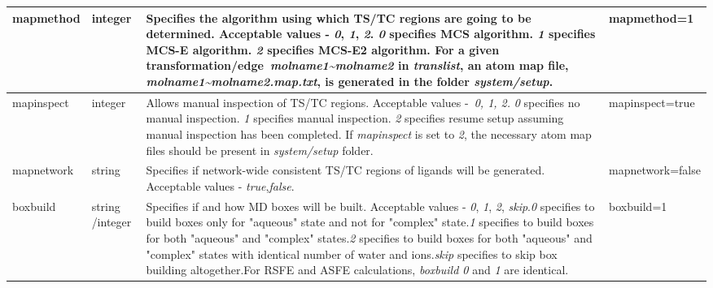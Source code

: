\documentclass[11pt,letterpaper,titlepage]{article}
\begin{document}
\begin{footnotesize}
\begin{landscape}
\begin{center}
\begin{longtable}[1]{p{3cm}|p{0.5cm}|p{11cm}|p{4cm}}
	mapmethod          & integer         & Specifies the algorithm using which TS/TC regions are going to be determined. Acceptable values - \textit{0}, \textit{1}, \textit{2}. \newline \textit{0} specifies MCS algorithm. \newline \textit{1} specifies MCS-E algorithm. \newline \textit{2} specifies MCS-E2 algorithm. \newline For a given transformation/edge~\textit{molname1\textasciitilde{}molname2} in \textit{translist}, an atom map file, \textit{molname1\textasciitilde{}molname2.map.txt}, is generated in the folder \textit{system/setup}.   & mapmethod=1      \\ 
\hline
	mapinspect         & integer         & Allows manual inspection of TS/TC regions. Acceptable values -~\textit{0, 1, 2.} \newline \textit{0} specifies no manual inspection. \newline\textit{1} specifies manual inspection. \newline \textit{2} specifies resume setup assuming manual inspection has been completed. \newline If \textit{mapinspect} is set to \textit{2}, the necessary atom map files should be present in \textit{system/setup} folder. & mapinspect=true \\
\hline
mapnetwork         & string          & Specifies if network-wide consistent TS/TC regions of ligands will be generated. Acceptable values - \textit{true},\textit{false}.    & mapnetwork=false     \\ 
\hline
boxbuild           & string /\newline integer  & Specifies if and how MD boxes will be built. Acceptable values - \textit{0}, \textit{1}, \textit{2}, \textit{skip}.\newline \textit{0} specifies to build boxes only for "aqueous" state and not for "complex" state.\newline \textit{1} specifies to build boxes for both "aqueous" and "complex" states.\newline \textit{2} specifies to build boxes for both "aqueous" and "complex" states with identical number of water and ions.\newline \textit{skip} specifies to skip box building altogether.\newline For RSFE and ASFE calculations, \textit{boxbuild 0} and \textit{1} are identical. & boxbuild=1   \\ 

\end{longtable}
\end{center}
\end{landscape}
\end{footnotesize}
\end{document}
